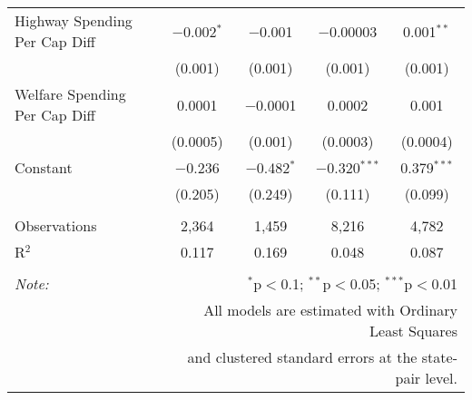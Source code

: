 \begin{table}[!htbp]
\begin{tabular}{@{\extracolsep{5pt}}lcccc}
  Highway Spending Per Cap Diff & $-$0.002$^{*}$ & $-$0.001 & $-$0.00003 & 0.001$^{**}$ \\ 
  & (0.001) & (0.001) & (0.001) & (0.001) \\ 
  Welfare Spending Per Cap Diff & 0.0001 & $-$0.0001 & 0.0002 & 0.001 \\ 
  & (0.0005) & (0.001) & (0.0003) & (0.0004) \\ 
  Constant & $-$0.236 & $-$0.482$^{*}$ & $-$0.320$^{***}$ & 0.379$^{***}$ \\ 
  & (0.205) & (0.249) & (0.111) & (0.099) \\ 
 \hline \\[-1.8ex] 
Observations & 2,364 & 1,459 & 8,216 & 4,782 \\ 
R$^{2}$ & 0.117 & 0.169 & 0.048 & 0.087 \\ 
\hline 
\hline \\[-1.8ex] 
\textit{Note:}  & \multicolumn{4}{r}{$^{*}$p$<$0.1; $^{**}$p$<$0.05; $^{***}$p$<$0.01} \\ 
 & \multicolumn{4}{r}{All models are estimated with Ordinary Least Squares} \\ 
 & \multicolumn{4}{r}{and clustered standard errors at the state-pair level.} \\ 
\end{tabular} 
\end{table} 
